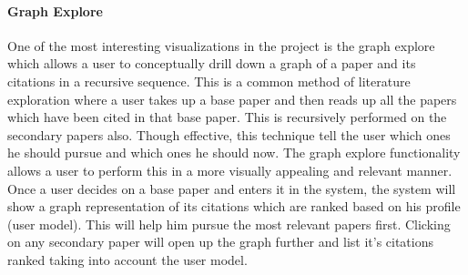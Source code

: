 \paragraph{Graph Explore} One of the most interesting visualizations in the project is the graph explore which allows a user to conceptually drill down a graph of a paper and its citations in a recursive sequence. This is a common method of literature exploration where a user takes up a base paper and then reads up all the papers which have been cited in that base paper. This is recursively performed on the secondary papers also. Though effective, this technique tell the user which ones he should pursue and which ones he should now. The graph explore functionality allows a user to perform this in a more visually appealing and relevant manner. Once a user decides on a base paper and enters it in the system, the system will show a graph representation of its citations which are ranked based on his profile (user model). This will help him pursue the most relevant papers first. Clicking on any secondary paper will open up the graph further and list it's citations ranked taking into account the user model.